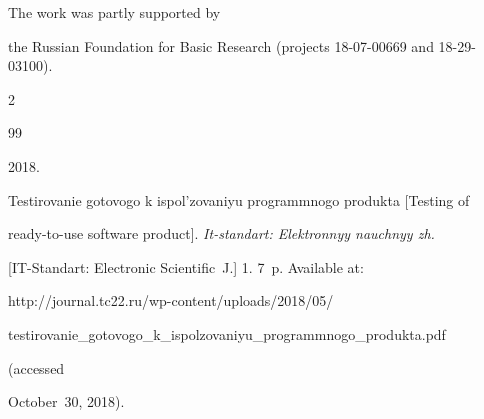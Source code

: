 \Ack


\noindent


The work was partly supported by


the Russian Foundation for Basic Research (projects 18-07-00669 and 18-29-03100).
















  \begin{multicols}{2}





\renewcommand{\bibname}{\protect\rmfamily References}







{\small\frenchspacing


 {%




 \begin{thebibliography}{99}


 










 2018. 


Testirovanie gotovogo k ispol'zovaniyu programmnogo produkta [Testing of 


ready-to-use software product]. \textit{It-standart: Elektronnyy nauchnyy zh.} 


 [IT-Standart: Electronic Scientific~J.]  1. 7~p. Available at: {\sf  


http://journal.tc22.ru/wp-content/uploads/2018/05/\linebreak 


testirovanie\_gotovogo\_k\_ispolzovaniyu\_programmnogo\_\linebreak produkta.pdf} (accessed 


October~30, 2018).



\end{thebibliography}}}
\end{multicols}
